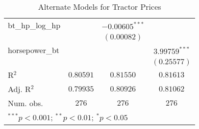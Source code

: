 \begin{table}
\begin{center}
\begin{tabular}{l c c c}
bt\_hp\_log\_hp     &                  & $-0.00605^{***}$ &                  \\
                    &                  & $(0.00082)$      &                  \\
horsepower\_bt      &                  &                  & $3.99759^{***}$  \\
                    &                  &                  & $(0.25577)$      \\
\hline
R$^2$               & $0.80591$        & $0.81550$        & $0.81613$        \\
Adj. R$^2$          & $0.79935$        & $0.80926$        & $0.81062$        \\
Num. obs.           & $276$            & $276$            & $276$            \\
\hline
\multicolumn{4}{l}{\scriptsize{$^{***}p<0.001$; $^{**}p<0.01$; $^{*}p<0.05$}}
\end{tabular}
\caption{Alternate Models for Tractor Prices}
\label{tab:reg_sq_horse_bt}
\end{center}
\end{table}
